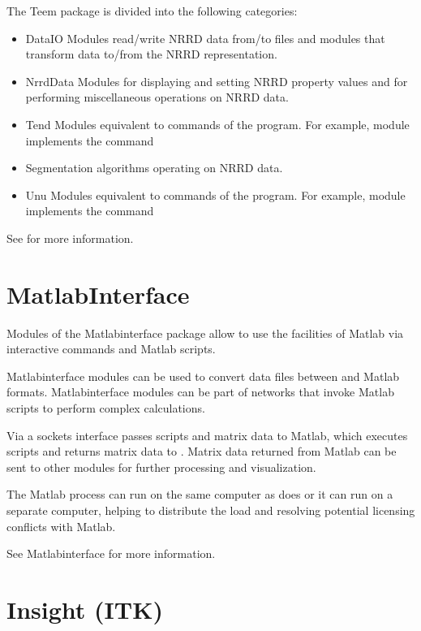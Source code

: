 The Teem package is divided into the following categories:

\begin{itemize}
\item DataIO Modules read/write NRRD data from/to files and
  modules that transform data to/from the NRRD representation.
\item NrrdData Modules for displaying and setting NRRD property values
  and for performing miscellaneous operations on NRRD data.
\item Tend Modules equivalent to commands of the 
  program.  For example, module  implements the
  command 
\item Segmentation  algorithms operating on NRRD data.
\item Unu Modules equivalent to commands of the  program.
  For example, module  implements the command
\end{itemize}

See  for more
information.

\section{MatlabInterface}
\label{sec:matlabpackage}

Modules of the Matlabinterface package allow \sr{} to use the
facilities of Matlab via interactive commands and Matlab scripts.

Matlabinterface modules can be used to convert
data files between \sr{} and Matlab formats.  Matlabinterface
modules can be part of \sr{} networks that invoke Matlab scripts to
perform complex calculations.

Via a sockets interface \sr{} passes scripts and matrix data to
Matlab, which executes  scripts and returns matrix data to \sr{}.
Matrix data returned from Matlab can be sent to other modules for
further processing and visualization.

The Matlab process can run on the same computer as does \sr{} or it
can run on a separate computer, helping to distribute the load and
resolving potential licensing conflicts with Matlab.

See Matlabinterface  for more
information.

\section{Insight (ITK)}
\label{sec:insightpackage}

